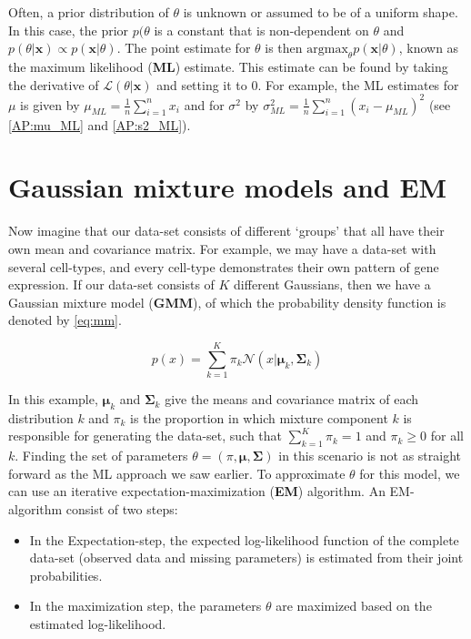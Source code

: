  Often, a prior distribution of $\theta$ is unknown or assumed to be of a uniform shape. In this case, the prior $p(\theta$ is a constant that is non-dependent on $\theta$ and $ p(\theta|\bm{x}) \propto p(\bm{x}|\theta)$. The point estimate for $\theta$ is then $\text{argmax}_\theta p(\bm{x}|\theta)$, known as the maximum likelihood (\textbf{ML}) estimate. This estimate can be found by taking the derivative of $\mathcal{L}(\theta|\bm{x})$ and setting it to $0$. For example, the ML estimates for $\mu$ is given by $\mu_{ML} = \frac{1}{n} \sum_{i=1}^{n} x_i$ and for $\sigma^2$ by $\sigma^2_{ML} = \frac{1}{n} \sum_{i=1}^{n} (x_i - \mu_{ML})^2$ (see \ref{AP:mu_ML} and \ref{AP:s2_ML}).\\

\section{Gaussian mixture models and EM}\label{app:gmm_em}
Now imagine that our data-set consists of different `groups' that all have their own mean and covariance matrix. For example, we may have a data-set with several cell-types, and every cell-type demonstrates their own pattern of gene expression. If our data-set consists of $K$ different Gaussians, then we have a Gaussian mixture model (\textbf{GMM}), of which the probability density function is denoted by \ref{eq:mm}.

\begin{equation}\label{eq:mm}
    p(x) = \sum_{k=1}^K \pi_k \mathcal{N}(x|\bm{\mu}_k, \bm{\Sigma}_k)
\end{equation}

In this example, $\bm{\mu}_k$ and $\bm{\Sigma}_k$ give the means and covariance matrix of each distribution $k$ and $\pi_k$ is the proportion in which mixture component $k$ is responsible for generating the data-set, such that $\sum^K_{k=1}\pi_k = 1$ and $\pi_k\geq0$ for all $k$.
 Finding the set of parameters $\theta = (\pi, \bm{\mu}, \bm{\Sigma})$ in this scenario is not as straight forward as the ML approach we saw earlier. To approximate $\theta$ for this model, we can use an iterative expectation-maximization (\textbf{EM}) algorithm. An EM-algorithm consist of two steps:
 
 \begin{itemize}
     \item In the Expectation-step, the expected log-likelihood function of the complete data-set (observed data and missing parameters) is estimated from their joint probabilities.
     \item In the maximization step, the parameters $\theta$ are maximized based on the estimated log-likelihood.
 \end{itemize}

